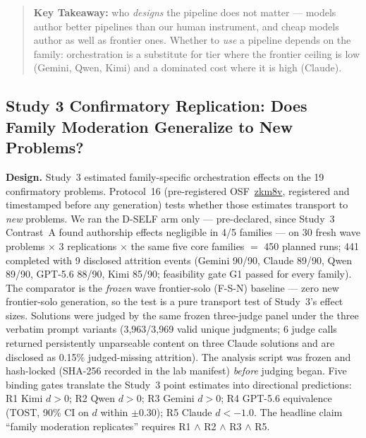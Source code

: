 \documentclass[12pt,a4paper]{article}
\begin{document}
\begin{quote}
\textbf{Key Takeaway:} who \emph{designs} the pipeline does not matter ---
models author better pipelines than our human instrument, and cheap models
author as well as frontier ones. Whether to \emph{use} a pipeline depends on
the family: orchestration is a substitute for tier where the frontier ceiling
is low (Gemini, Qwen, Kimi) and a dominated cost where it is high (Claude).
\end{quote}

\subsection{Study 3 Confirmatory Replication: Does Family Moderation
Generalize to New Problems?}\label{sec:study3conf}

\textbf{Design.} Study~3 estimated family-specific orchestration effects on
the 19 confirmatory problems. Protocol~16 (pre-registered
OSF~\href{https://osf.io/zkm8v}{zkm8v}, registered and timestamped before any
generation) tests whether those estimates transport to \emph{new} problems.
We ran the D-SELF arm only --- pre-declared, since Study~3 Contrast~A found
authorship effects negligible in 4/5 families --- on 30 fresh wave problems
$\times$ 3 replications $\times$ the same five core families $=$ 450 planned
runs; 441 completed with 9 disclosed attrition events (Gemini 90/90, Claude
89/90, Qwen 89/90, GPT-5.6 88/90, Kimi 85/90; feasibility gate G1 passed for
every family). The comparator is the \emph{frozen} wave frontier-solo (F-S-N)
baseline --- zero new frontier-solo generation, so the test is a pure
transport test of Study~3's effect sizes. Solutions were judged by the same
frozen three-judge panel under the three verbatim prompt variants
(3{,}963/3{,}969 valid unique judgments; 6 judge calls returned persistently
unparseable content on three Claude solutions and are disclosed as 0.15\%
judged-missing attrition). The analysis script was frozen and hash-locked
(SHA-256 recorded in the lab manifest) \emph{before} judging began. Five
binding gates translate the Study~3 point estimates into directional
predictions: R1 Kimi $d > 0$; R2 Qwen $d > 0$; R3 Gemini $d > 0$; R4 GPT-5.6
equivalence (TOST, 90\% CI on $d$ within $\pm 0.30$); R5 Claude $d < -1.0$.
The headline claim ``family moderation replicates'' requires
R1 $\wedge$ R2 $\wedge$ R3 $\wedge$ R5.
\end{document}
